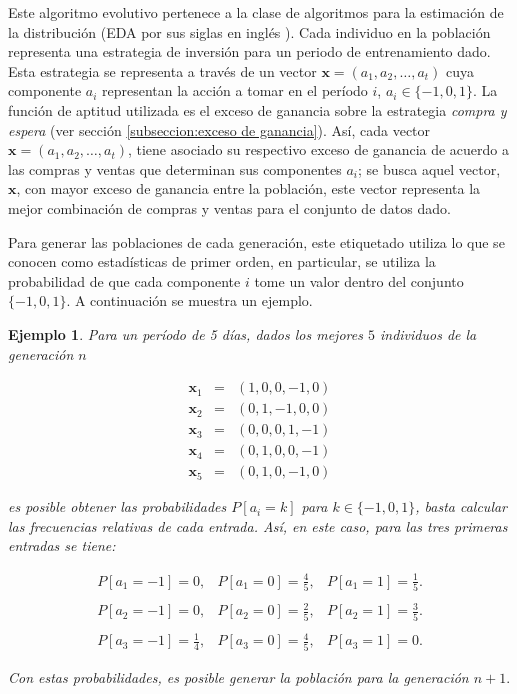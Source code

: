 \documentclass[12pt]{report}
\theoremstyle{break}
\newtheorem{ejemplo}{Ejemplo}[chapter]
\theoremstyle{break}
\begin{document}
Este algoritmo evolutivo pertenece a la clase de algoritmos para la estimación de la distribución (EDA por sus siglas en inglés \cite{simon2013evolutionary}). Cada individuo en la población representa una estrategia de inversión para un periodo de entrenamiento dado. Esta estrategia se representa a través de un vector $\mathbf{x} = (a_1, a_2, \ldots, a_t)$ cuya componente $a_i$ representan la acción a tomar en el período $i$, $a_i \in \{-1,0,1\}.$ La función de aptitud utilizada es el exceso de ganancia sobre la estrategia \textit{compra y espera} (ver sección \ref{subseccion:exceso de ganancia}). Así, cada vector $\mathbf{x} = (a_1, a_2, \ldots, a_t)$, tiene asociado su respectivo exceso de ganancia de acuerdo a las compras y ventas que determinan sus componentes $a_i$; se busca aquel vector, $\mathbf{x}$, con mayor exceso de ganancia entre la población, este vector representa la mejor combinación de compras y ventas para el conjunto de datos dado.

Para generar las poblaciones de cada generación, este etiquetado utiliza lo que se conocen como estadísticas de primer orden, en particular, se utiliza la probabilidad de que cada componente $i$ tome un valor dentro del conjunto $\{-1, 0, 1\}$. A continuación se muestra un ejemplo.

\begin{ejemplo}
Para un período de 5 días, dados los mejores $5$ individuos de la generación $n$

$$
\begin{array}{ccc}
\mathbf{x}_1 & = & (1, 0, 0, -1, 0) \\
\mathbf{x}_2 & = & (0, 1, -1, 0, 0) \\ 
\mathbf{x}_3 & = & (0, 0, 0, 1, -1) \\
\mathbf{x}_4 & = & (0, 1, 0, 0, -1) \\
\mathbf{x}_5 & = & (0, 1, 0, -1, 0)
\end{array}
$$

es posible obtener las probabilidades $P\left[a_{i} = k \right]$ para $k \in \{-1, 0, 1\}$, basta calcular las frecuencias relativas de cada entrada. Así, en este caso, para las tres primeras entradas se tiene:

$$
\begin{array}{lcr}
P[a_1 = -1] = 0, & P[a_1 = 0] = \tfrac{4}{5}, & P[a_1 = 1] = \tfrac{1}{5}. \\ \\
P[a_2 = -1] = 0, & P[a_2 = 0] = \tfrac{2}{5}, & P[a_2 = 1] = \tfrac{3}{5}. \\ \\
P[a_3 = -1] = \tfrac{1}{4}, & P[a_3 = 0] = \tfrac{4}{5}, & P[a_3 = 1] = 0.
\end{array}
$$

Con estas probabilidades, es posible generar la población para la generación $n + 1.$
\end{ejemplo}
\end{document}
